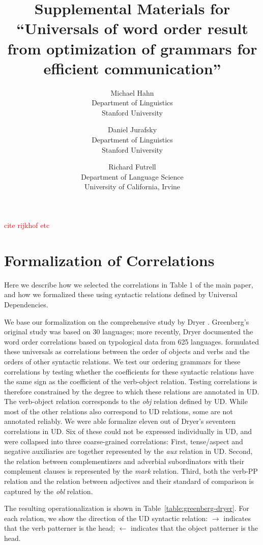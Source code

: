 \documentclass[10pt,twoside,lineno]{article}
\title{Supplemental Materials for ``Universals of word order result from optimization of grammars for efficient communication''}
\author{
        Michael Hahn \\
                Department of Linguistics\\
       Stanford University
            \and
       Daniel Jurafsky\\
       Department of Linguistics\\
       Stanford University \\
       \and
       Richard Futrell\\
       Department of Language Science\\
       University of California, Irvine
}
\begin{document}
\maketitle




\tableofcontents


\textcolor{red}{cite rijkhof etc}



\section{Formalization of Correlations}\label{sec:correlations}


Here we describe how we selected the correlations in Table 1 of the main paper, and how we formalized these using syntactic relations defined by Universal Dependencies.

We base our formalization on the comprehensive study by Dryer \cite{dryer1992greenbergian}. %
Greenberg's original study was based on 30 languages; more recently, Dryer \cite{dryer1992greenbergian} documented the word order correlations based on typological data from 625 languages.
\cite{dryer1992greenbergian} formulated these universals as correlations between the order of objects and verbs and the orders of other syntactic relations.
We test our ordering grammars for these correlations by testing whether the coefficients for these syntactic relations have the same sign as the coefficient of the verb-object relation.
Testing correlations is therefore constrained by the degree to which these relations are annotated in UD.
The verb-object relation corresponds to the  \emph{obj} relation defined by UD.
While most of the other relations also correspond to UD relations, some are not annotated reliably.
We were able formalize eleven out of Dryer's seventeen correlations in UD.
Six of these could not be expressed individually in UD, and were collapsed into three coarse-grained correlations:
First, tense/aspect and negative auxiliaries are together represented by the \emph{aux} relation in UD.
Second, the relation between complementizers and adverbial subordinators with their complement clauses is represented by the \emph{mark} relation.
Third, both the verb-PP relation and the relation between adjectives and their standard of comparison is captured by the \emph{obl} relation.

The resulting operationalization is shown in Table~\ref{table:greenberg-dryer}.
For each relation, we show the direction of the UD syntactic relation: $\rightarrow$ indicates that the verb patterner is the head; $\leftarrow$ indicates that the object patterner is the head.
\end{document}
